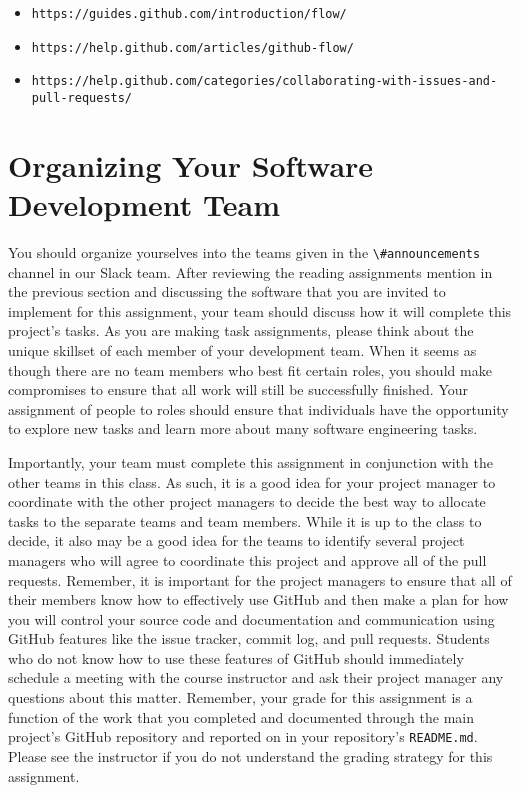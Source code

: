 \documentclass[11pt]{article}
\newcommand{\reflection}{\lstinline{README.md}}
\newcommand{\url}[1]{\lstinline{#1}}
\newcommand{\channel}[1]{\lstinline{#1}}
\begin{document}
\vspace*{-.5em}

\begin{itemize}
  \setlength{\itemsep}{0pt}
  \item \url{https://guides.github.com/introduction/flow/}
  \item \url{https://help.github.com/articles/github-flow/}
  \item \url{https://help.github.com/categories/collaborating-with-issues-and-pull-requests/}
\end{itemize}

\vspace*{-1em}

\section*{Organizing Your Software Development Team}

You should organize yourselves into the teams given in the \channel{\#announcements} channel in our Slack team. After
reviewing the reading assignments mention in the previous section and discussing the software that you are invited to
implement for this assignment, your team should discuss how it will complete this project's tasks. As you are making
task assignments, please think about the unique skillset of each member of your development team. When it seems as
though there are no team members who best fit certain roles, you should make compromises to ensure that all work will
still be successfully finished. Your assignment of people to roles should ensure that individuals have the opportunity
to explore new tasks and learn more about many software engineering tasks.

Importantly, your team must complete this assignment in conjunction with the other teams in this class. As such, it is a
good idea for your project manager to coordinate with the other project managers to decide the best way to allocate
tasks to the separate teams and team members. While it is up to the class to decide, it also may be a good idea for the
teams to identify several project managers who will agree to coordinate this project and approve all of the pull
requests. Remember, it is important for the project managers to ensure that all of their members know how to effectively
use GitHub and then make a plan for how you will control your source code and documentation and communication using
GitHub features like the issue tracker, commit log, and pull requests. Students who do not know how to use these
features of GitHub should immediately schedule a meeting with the course instructor and ask their project manager any
questions about this matter. Remember, your grade for this assignment is a function of the work that you completed and
documented through the main project's GitHub repository and reported on in your repository's \reflection{}. Please see
the instructor if you do not understand the grading strategy for this assignment.
\end{document}
